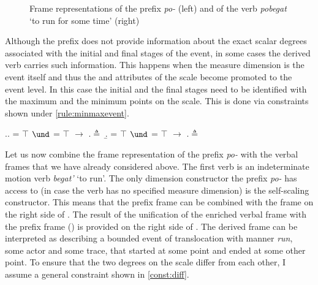 \begin{figure}
\begin{minipage}{0.4\textwidth}
\end{minipage}
\begin{minipage}{0.55\textwidth}
\end{minipage}
\caption{Frame representations of the prefix \textit{po-} (left) and of the verb \textit{pobegat} `to run for some time' (right) \label{frame:po:delim}}
\end{figure}

Although the prefix does not provide information about the exact scalar degrees associated with the initial and final stages of the event, in some cases the derived verb carries such information. This happens when the measure dimension is the event itself and thus the \MIN and \MAX attributes of the scale become promoted to the event level. In this case the initial and the final stages need to be identified with the maximum and the minimum points on the scale. This is done via constraints shown under \ref{rule:minmaxevent}.

\ex.\label{rule:minmaxevent}\a. \MIN = $\top$ $\und$ \INIT = $\top$ $\rightarrow$ \INIT.\POS $\triangleq$ \MIN
\b. \MAX = $\top$ $\und$ \FIN = $\top$ $\rightarrow$ \FIN.\POS $\triangleq$ \MAX

Let us now combine the frame representation of the prefix \textit{po-} with the verbal frames that we have already considered above. The first verb is an indeterminate motion verb \textit{begat'} `to run'. The only dimension constructor the prefix \textit{po-} has access to (in case the verb has no specified measure dimension) is the self-scaling constructor. This means that the prefix frame can be combined with the frame on the right side of . The result of the unification of the enriched verbal frame with the prefix frame () is provided on the right side of . The derived frame can be interpreted as describing a bounded event of translocation with manner \textit{run}, some actor and some trace, that started at some point and ended at some other point. To ensure that the two degrees on the scale differ from each other, I assume a general constraint shown in \ref{const:diff}.

